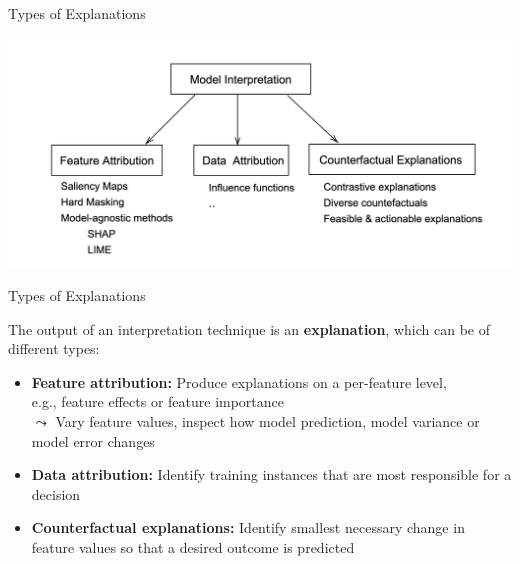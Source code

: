 \documentclass[11pt,compress,t,notes=noshow, aspectratio=169, xcolor=table]{beamer}
\begin{document}
\begin{frame}{Types of Explanations}
	\begin{center}
		\includegraphics[width=\textwidth]{figure/1-attributions.png}
    \end{center}
\end{frame}



\begin{frame}{Types of Explanations}

	The output of an interpretation technique is an \textbf{explanation}, which can be of different types:

    \medskip

	\begin{itemize}
  \itemsep1em
	\item
		\textbf{Feature attribution:} Produce explanations on a per-feature level, \\
		e.g., feature effects or feature importance
		\\
		$\leadsto$ Vary feature values, inspect how model prediction, model variance or model error changes

	\item
		\textbf{Data attribution:}
		Identify training instances that are most responsible for a decision

	\item
	   \textbf{Counterfactual explanations:}
	   Identify smallest necessary change in feature values so that a desired outcome is predicted
	   \\

	\end{itemize}

\end{frame}
\end{document}
